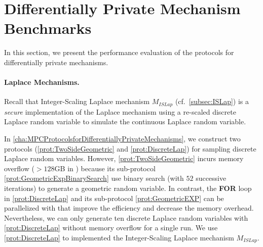 \section{Differentially Private Mechanism Benchmarks}
\label{sec:DifferentiallyPirvateMechanismBenchmarks}
In this section, we present the performance evaluation of the \smpc protocols for differentially private mechanisms.

\paragraph{Laplace Mechanisms.}
Recall that Integer-Scaling Laplace mechanism $M_{ISLap} $ (cf.~\autoref{subsec:ISLap}) is a \textit{secure} implementation of the Laplace mechanism using a re-scaled discrete Laplace random variable to simulate the continuous Laplace random variable.

In \autoref{cha:MPCProtocolsforDifferentiallyPrivateMechanisms}, we construct two \smpc protocols (\autoref{prot:TwoSideGeometric} and \autoref{prot:DiscreteLap}) for sampling discrete Laplace random variables. However, \autoref{prot:TwoSideGeometric} incurs memory overflow ($>128$GB in \twopc) because its sub-protocol \autoref{prot:GeometricExpBinarySearch} use binary search (with $52$ successive iterations) to generate a geometric random variable. In contrast, the \textbf{FOR} loop in \autoref{prot:DiscreteLap} and its sub-protocol \autoref{prot:GeometricEXP} can be parallelized with \simd that improve the efficiency and decrease the memory overhead.
Nevertheless, we can only generate ten discrete Laplace random variables with \autoref{prot:DiscreteLap} without memory overflow for a single run.
We use \autoref{prot:DiscreteLap} to implemented the Integer-Scaling Laplace mechanism $M_{ISLap}$.


